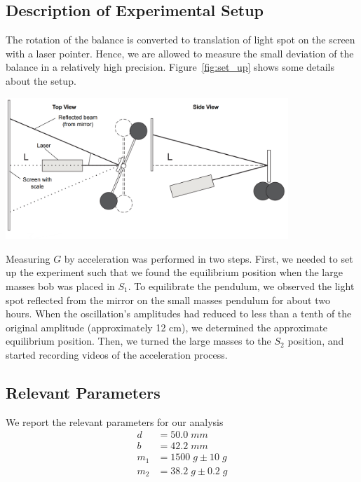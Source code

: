 \documentclass{article}
\begin{document}
\subsection{Description of Experimental Setup}
The rotation of the balance is converted to translation of light spot on the screen with a laser pointer. Hence, we are allowed to measure the small deviation of the balance in a relatively high precision. Figure~\ref{fig:set_up} shows some details about the setup. 
\begin{center}
    \includegraphics[width = 0.8\textwidth]{figures/setup_fig8.png}
    \label{fig:set_up}
\end{center}

Measuring $G$ by acceleration was performed in two steps. First, we needed to set up the experiment such that we found the equilibrium position when the large masses bob was placed in  $S_1$. To equilibrate the pendulum, we observed the light spot reflected from the mirror on the small masses pendulum for about two hours. When the oscillation's amplitudes had reduced to less than a tenth of the original amplitude (approximately 12 cm), we determined the approximate equilibrium position. Then, we turned the large masses to the $S_2$ position, and started recording videos of the acceleration process. 

\subsection{Relevant Parameters}
We report the relevant parameters for our analysis 
\begin{align*}
    d &= 50.0 \;\si{mm} \\
    b &= 42.2 \;\si{mm} \\
    m_1 &= 1500 \;\si{g} \pm 10 \;\si{g} \\
    m_2 &= 38.2 \;\si{g} \pm 0.2 \;\si{g}
\end{align*}
\end{document}
